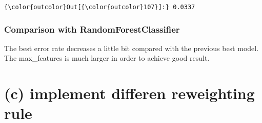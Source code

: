 \documentclass[11pt]{article}
\begin{document}
\begin{Verbatim}[commandchars=\\\{\}]
{\color{outcolor}Out[{\color{outcolor}107}]:} 0.0337
\end{Verbatim}
            
    \hypertarget{comparison-with-randomforestclassifier}{%
\subsubsection{Comparison with
RandomForestClassifier}\label{comparison-with-randomforestclassifier}}

The best error rate decreases a little bit compared with the previous
best model. The max\_features is much larger in order to achieve good
result.

    \hypertarget{c-implement-differen-reweighting-rule}{%
\section{(c) implement differen reweighting
rule}\label{c-implement-differen-reweighting-rule}}
\end{document}
